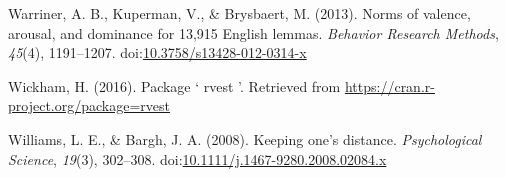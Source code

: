 \documentclass[english,,man]{apa6}
\begin{document}
\hypertarget{ref-Warriner2013}{}
Warriner, A. B., Kuperman, V., \& Brysbaert, M. (2013). Norms of
valence, arousal, and dominance for 13,915 English lemmas.
\emph{Behavior Research Methods}, \emph{45}(4), 1191--1207.
doi:\href{https://doi.org/10.3758/s13428-012-0314-x}{10.3758/s13428-012-0314-x}

\hypertarget{ref-Wickham2016}{}
Wickham, H. (2016). Package ` rvest '. Retrieved from
\url{https://cran.r-project.org/package=rvest}

\hypertarget{ref-Williams2008}{}
Williams, L. E., \& Bargh, J. A. (2008). Keeping one's distance.
\emph{Psychological Science}, \emph{19}(3), 302--308.
doi:\href{https://doi.org/10.1111/j.1467-9280.2008.02084.x}{10.1111/j.1467-9280.2008.02084.x}

\endgroup
\end{document}
